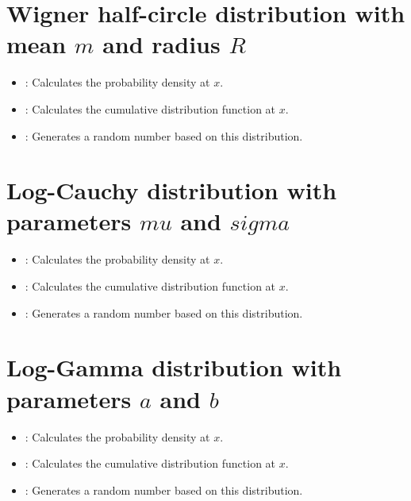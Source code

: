 \section{Wigner half-circle distribution with mean \texorpdfstring{$m$}{m} and radius \texorpdfstring{$R$}{R}}

\begin{itemize}

\item
{}:
Calculates the probability density at $x$.

\item
{}:
Calculates the cumulative distribution function at $x$.

\item
{}:
Generates a random number based on this distribution.

\end{itemize}



\section{Log-Cauchy distribution with parameters \texorpdfstring{$mu$}{mu} and \texorpdfstring{$sigma$}{sigma}}

\begin{itemize}

\item
{}:
Calculates the probability density at $x$.

\item
{}:
Calculates the cumulative distribution function at $x$.

\item
{}:
Generates a random number based on this distribution.

\end{itemize}



\section{Log-Gamma distribution with parameters \texorpdfstring{$a$}{a} and \texorpdfstring{$b$}{b}}

\begin{itemize}

\item
{}:
Calculates the probability density at $x$.

\item
{}:
Calculates the cumulative distribution function at $x$.

\item
{}:
Generates a random number based on this distribution.

\end{itemize}



